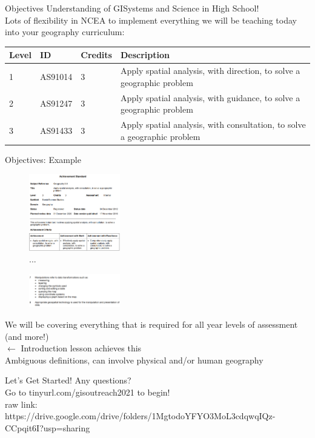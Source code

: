 \documentclass{beamer}
\begin{document}
\begin{frame}{Objectives}
    Understanding of GISystems and Science in High School! \\
    \vspace{1cm}
    Lots of flexibility in NCEA to implement everything we will be teaching today into your geography curriculum:
    \vspace{0.5cm}
    
    \centering
    \scriptsize
    \begin{tabular}{|p{1cm}|p{2cm}|p{1cm}|p{5cm}|}
        \hline
        Level & ID & Credits & Description  \\
        \hline 
        1 & AS91014 & 3 &  Apply spatial analysis, with direction, to solve a geographic problem \\
        \hline
        2 & AS91247 & 3 & Apply spatial analysis, with guidance, to solve a geographic problem \\
        \hline
        3 & AS91433 & 3 & Apply spatial analysis, with consultation, to solve a geographic problem \\
        \hline
    \end{tabular}
\end{frame}

\begin{frame}{Objectives: Example}
\begin{minipage}{.5\textwidth}
  \centering
  \begin{figure}
    \includegraphics[width=150px]{images/standard_example.PNG}\\
    
    ...
    
    \includegraphics[width=150px]{images/standard_example_2.PNG}\\
  \end{figure}
\end{minipage}%
\begin{minipage}{.5\textwidth}
  We will be covering everything that is required for all year levels of assessment (and more!)\\
  
  $\leftarrow$ Introduction lesson achieves this \\
  
  Ambiguous definitions, can involve physical and/or human geography
\end{minipage}
\end{frame}

\begin{frame}{Let's Get Started!}
    Any questions? \\
    \vspace{2cm}
    Go to tinyurl.com/gisoutreach2021 to begin! \\
    \tiny raw link: https://drive.google.com/drive/folders/1MgtodoYFYO3MoL3cdqwqIQz-CCpqit6I?usp=sharing
\end{frame}
\end{document}
